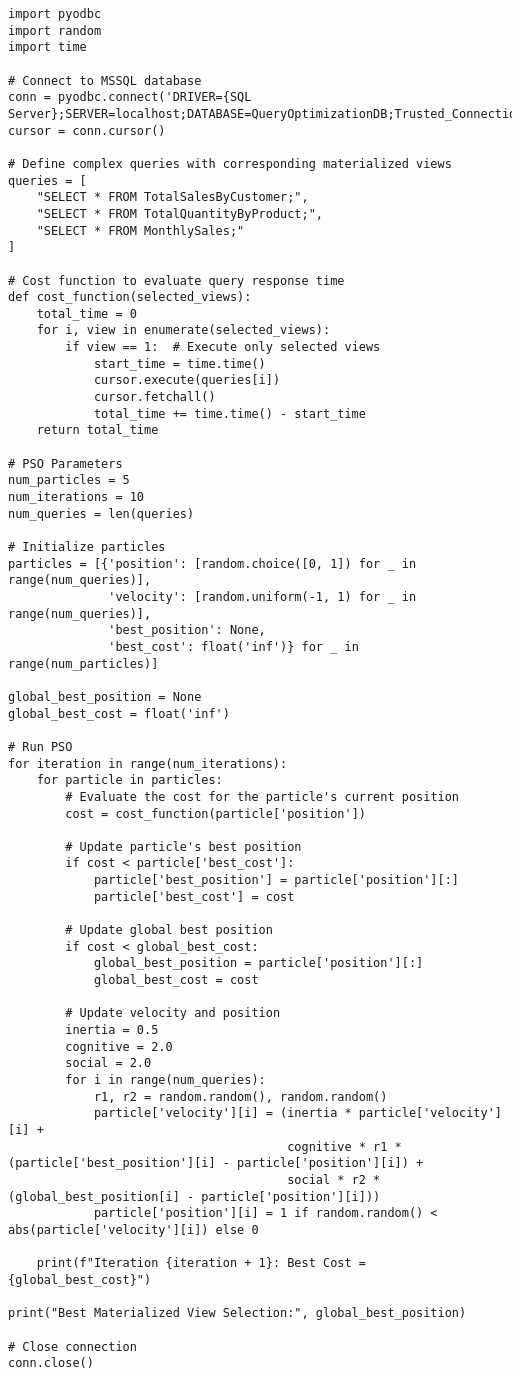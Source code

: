\begin{lstlisting}[style=python, caption={Python Code Example}]
import pyodbc
import random
import time

# Connect to MSSQL database
conn = pyodbc.connect('DRIVER={SQL Server};SERVER=localhost;DATABASE=QueryOptimizationDB;Trusted_Connection=yes;')
cursor = conn.cursor()

# Define complex queries with corresponding materialized views
queries = [
    "SELECT * FROM TotalSalesByCustomer;",
    "SELECT * FROM TotalQuantityByProduct;",
    "SELECT * FROM MonthlySales;"
]

# Cost function to evaluate query response time
def cost_function(selected_views):
    total_time = 0
    for i, view in enumerate(selected_views):
        if view == 1:  # Execute only selected views
            start_time = time.time()
            cursor.execute(queries[i])
            cursor.fetchall()
            total_time += time.time() - start_time
    return total_time

# PSO Parameters
num_particles = 5
num_iterations = 10
num_queries = len(queries)

# Initialize particles
particles = [{'position': [random.choice([0, 1]) for _ in range(num_queries)],
              'velocity': [random.uniform(-1, 1) for _ in range(num_queries)],
              'best_position': None,
              'best_cost': float('inf')} for _ in range(num_particles)]

global_best_position = None
global_best_cost = float('inf')

# Run PSO
for iteration in range(num_iterations):
    for particle in particles:
        # Evaluate the cost for the particle's current position
        cost = cost_function(particle['position'])

        # Update particle's best position
        if cost < particle['best_cost']:
            particle['best_position'] = particle['position'][:]
            particle['best_cost'] = cost

        # Update global best position
        if cost < global_best_cost:
            global_best_position = particle['position'][:]
            global_best_cost = cost

        # Update velocity and position
        inertia = 0.5
        cognitive = 2.0
        social = 2.0
        for i in range(num_queries):
            r1, r2 = random.random(), random.random()
            particle['velocity'][i] = (inertia * particle['velocity'][i] +
                                       cognitive * r1 * (particle['best_position'][i] - particle['position'][i]) +
                                       social * r2 * (global_best_position[i] - particle['position'][i]))
            particle['position'][i] = 1 if random.random() < abs(particle['velocity'][i]) else 0

    print(f"Iteration {iteration + 1}: Best Cost = {global_best_cost}")

print("Best Materialized View Selection:", global_best_position)

# Close connection
conn.close()

\end{lstlisting}